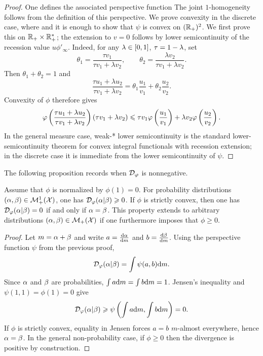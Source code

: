 \begin{proof}
	One defines the associated perspective function
		The joint $1$-homogeneity follows from the definition of this perspective. We prove convexity in the discrete case, where
		and it is enough to show that $\psi$ is convex on $(\mathbb{R}_+)^2$. We first prove this on $\mathbb{R}_+ \times \mathbb{R}_+^*$; the extension to $v=0$ follows by lower semicontinuity of the recession value $u\phi'_\infty$.
		Indeed, for any $\lambda \in [0,1]$, $\tau=1-\lambda$, set
		\[
			\theta_1=\frac{\tau v_1}{\tau v_1+\lambda v_2},
			\qquad
			\theta_2=\frac{\lambda v_2}{\tau v_1+\lambda v_2}.
		\]
		Then $\theta_1+\theta_2=1$ and
		\[
			\frac{\tau u_1+\lambda u_2}{\tau v_1+\lambda v_2}
			=
			\theta_1\frac{u_1}{v_1}
			+
			\theta_2\frac{u_2}{v_2}.
		\]
		Convexity of $\phi$ therefore gives
		\[
			\varphi\left(  \frac{\tau u_1+\lambda u_2}{\tau v_1+\lambda v_2}  \right)
			(\tau v_1+\lambda v_2)
			\leqslant
			\tau v_1\varphi\left( \frac{u_1}{v_1} \right)
			+
			\lambda v_2\varphi\left( \frac{u_2}{v_2} \right) .
		\]
		In the general measure case, weak-* lower semicontinuity is the standard lower-semicontinuity theorem for convex integral functionals with recession extension; in the discrete case it is immediate from the lower semicontinuity of $\psi$.
\end{proof}

The following proposition records when $\mathcal{D}_\varphi$ is nonnegative.

\begin{proposition}\label{phi-div-positive}
Assume that $\phi$ is normalized by $\phi(1)=0$. For probability distributions $(\alpha,\beta) \in \mathcal{M}_+^1(\mathcal{X})$, one has $\mathcal{D}_\varphi(\alpha|\beta) \geqslant 0$. If $\phi$ is strictly convex, then one has $\mathcal{D}_\varphi(\alpha|\beta)=0$ if and only if $\alpha=\beta$.
%
This property extends to arbitrary distributions $(\alpha,\beta) \in \mathcal{M}_+(\mathcal{X})$ if one furthermore imposes that $\phi \geq 0$.
\end{proposition}

\begin{proof}
		Let $m=\alpha+\beta$ and write $a=\frac{\mathrm{d}\alpha}{\mathrm{d} m}$ and $b=\frac{\mathrm{d}\beta}{\mathrm{d} m}$. Using the perspective function $\psi$ from the previous proof,
		\[
			\mathcal{D}_\varphi(\alpha|\beta)=\int \psi(a,b)\mathrm{d} m .
		\]
		Since $\alpha$ and $\beta$ are probabilities, $\int a\mathrm{d} m=\int b\mathrm{d} m=1$. Jensen's inequality and $\psi(1,1)=\phi(1)=0$ give
		\[
			\mathcal{D}_\varphi(\alpha|\beta)
			\geqslant
			\psi\left( \int a\mathrm{d} m,\int b\mathrm{d} m \right)=0.
		\]
		If $\phi$ is strictly convex, equality in Jensen forces $a=b$ $m$-almost everywhere, hence $\alpha=\beta$. In the general non-probability case, if $\phi \geq 0$ then the divergence is positive by construction.
\end{proof}

